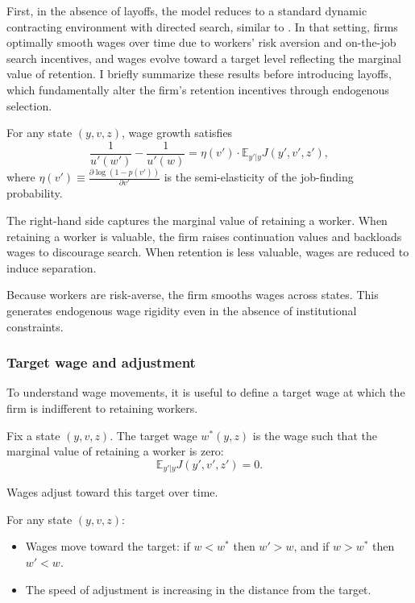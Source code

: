 First, in the absence of layoffs, the model reduces to a standard dynamic contracting environment with directed search, similar to \textcite{balke2022}. In that setting, firms optimally smooth wages over time due to workers’ risk aversion and on-the-job search incentives, and wages evolve toward a target level reflecting the marginal value of retention. I briefly summarize these results before introducing layoffs, which fundamentally alter the firm’s retention incentives through endogenous selection.

\begin{proposition}
For any state $(y,v,z)$, wage growth satisfies
\[
\frac{1}{u'(w')} - \frac{1}{u'(w)}
= \eta(v') \cdot \mathbb{E}_{y'|y}  J(y',v',z'),
\]
where $\eta(v') \equiv \frac{\partial \log(1-p(v'))}{\partial v'}$ is the semi-elasticity of the job-finding probability.
\end{proposition}

The right-hand side captures the marginal value of retaining a worker. When retaining a worker is valuable, the firm raises continuation values and backloads wages to discourage search. When retention is less valuable, wages are reduced to induce separation.

Because workers are risk-averse, the firm smooths wages across states. This generates endogenous wage rigidity even in the absence of institutional constraints.

\subsubsection*{Target wage and adjustment}

To understand wage movements, it is useful to define a target wage at which the firm is indifferent to retaining workers.

\begin{definition}
Fix a state $(y,v,z)$. The target wage $w^*(y,z)$ is the wage such that the marginal value of retaining a worker is zero:
\[
\mathbb{E}_{y'|y} J(y',v',z') = 0.
\]
\end{definition}

Wages adjust toward this target over time.

\begin{proposition}
For any state $(y,v,z)$:
\begin{itemize}
\item Wages move toward the target: if $w < w^*$ then $w' > w$, and if $w > w^*$ then $w' < w$.
\item The speed of adjustment is increasing in the distance from the target.
\end{itemize}
\end{proposition}

